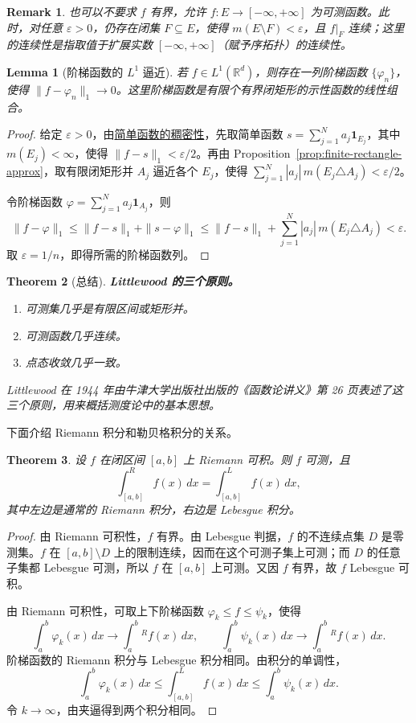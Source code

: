 \documentclass[12pt,letterpaper,twoside,openright]{ctexbook}
\theoremstyle{bluehead}
\newtheorem{theorem}{Theorem}
\newtheorem{lemma}[theorem]{Lemma}
\theoremstyle{olivehead}
\theoremstyle{orangehead}
\theoremstyle{redremark}
\newtheorem*{remark}{Remark}
\begin{document}
\begin{remark}
也可以不要求 $f$ 有界，允许 $f:E\to[-\infty,+\infty]$ 为可测函数。此时，对任意 $\varepsilon>0$，仍存在闭集 $F\subseteq E$，使得 $m(E\setminus F)<\varepsilon$，且 $f|_F$ 连续；这里的连续性是指取值于扩展实数 $[-\infty,+\infty]$（赋予序拓扑）的连续性。
\end{remark}
\begin{lemma}[阶梯函数的 $L^1$ 逼近]\label{lem:step-functions-l1-density}
若 $f\in L^1(\mathbb R^d)$，则存在一列阶梯函数 $\{\varphi_n\}$，使得 $\|f-\varphi_n\|_1\to0$。这里阶梯函数是有限个有界闭矩形的示性函数的线性组合。
\end{lemma}

\begin{proof}
给定 $\varepsilon>0$，由\hyperref[thm:simple-functions-lp-density]{简单函数的稠密性}，先取简单函数 $s=\sum_{j=1}^N a_j\mathbf1_{E_j}$，其中 $m(E_j)<\infty$，使得 $\|f-s\|_1<\varepsilon/2$。再由 Proposition~\ref{prop:finite-rectangle-approx}，取有限闭矩形并 $A_j$ 逼近各个 $E_j$，使得 $\sum_{j=1}^N|a_j|\,m(E_j\triangle A_j)<\varepsilon/2$。

令阶梯函数 $\varphi=\sum_{j=1}^N a_j\mathbf1_{A_j}$，则
\[
\|f-\varphi\|_1
\leq\|f-s\|_1+\|s-\varphi\|_1
\leq\|f-s\|_1+\sum_{j=1}^N|a_j|\,m(E_j\triangle A_j)
<\varepsilon.
\]
取 $\varepsilon=1/n$，即得所需的阶梯函数列。
\end{proof}
\begin{theorem}[总结]
\textbf{Littlewood 的三个原则。}
\begin{enumerate}
\item 可测集几乎是有限区间或矩形并。
\item 可测函数几乎连续。
\item 点态收敛几乎一致。
\end{enumerate}
Littlewood 在 1944 年由牛津大学出版社出版的《函数论讲义》第 26 页表述了这三个原则，用来概括测度论中的基本思想。
\end{theorem}
\noindent 下面介绍 Riemann 积分和勒贝格积分的关系。
\begin{theorem}
设 $f$ 在闭区间 $[a,b]$ 上 Riemann 可积。则 $f$ 可测，且
\[
\int_{[a,b]}^{R}f(x)\,dx
=\int_{[a,b]}^{L}f(x)\,dx,
\]
其中左边是通常的 Riemann 积分，右边是 Lebesgue 积分。
\end{theorem}
\begin{proof}
由 Riemann 可积性，$f$ 有界。由 Lebesgue 判据，$f$ 的不连续点集 $D$ 是零测集。$f$ 在 $[a,b]\setminus D$ 上的限制连续，因而在这个可测子集上可测；而 $D$ 的任意子集都 Lebesgue 可测，所以 $f$ 在 $[a,b]$ 上可测。又因 $f$ 有界，故 $f$ Lebesgue 可积。

由 Riemann 可积性，可取上下阶梯函数 $\varphi_k\leq f\leq\psi_k$，使得
\[
\int_a^b\varphi_k(x)\,dx\longrightarrow\int_a^b{}^{R}f(x)\,dx,
\qquad
\int_a^b\psi_k(x)\,dx\longrightarrow\int_a^b{}^{R}f(x)\,dx.
\]
阶梯函数的 Riemann 积分与 Lebesgue 积分相同。由积分的单调性，
\[
\int_a^b\varphi_k(x)\,dx
\leq\int_{[a,b]}^{L}f(x)\,dx
\leq\int_a^b\psi_k(x)\,dx.
\]
令 $k\to\infty$，由夹逼得到两个积分相同。
\end{proof}
\end{document}
